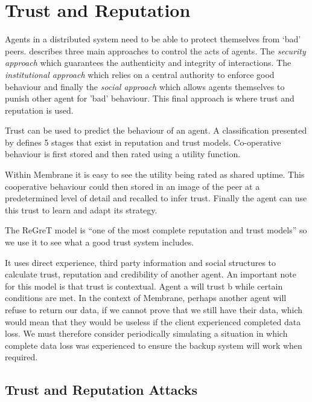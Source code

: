 \documentclass[11pt, a4paper, twocolumn, twoside]{report}
\begin{document}
\section{Trust and Reputation}

Agents in a distributed system need to be able to protect themselves from `bad' peers. \cite{pinyol2013computational} describes three main approaches to control the acts of agents. The \emph{security approach} which guarantees the authenticity and integrity of interactions. The \emph{institutional approach} which relies on a central authority to enforce good behaviour and finally the \emph{social approach} which allows agents themselves to punish other agent for 'bad' behaviour. This final approach is where trust and reputation is used.

Trust can be used to predict the behaviour of an agent. \citep{wooldridge2009introduction} A classification presented by \cite{balke2009using} defines 5 stages that exist in reputation and trust models. Co-operative behaviour is first stored and then rated using a utility function.

Within Membrane it is easy to see the utility being rated as shared uptime. This cooperative behaviour could then stored in an image of the peer at a predetermined level of detail and recalled to infer trust. Finally the agent can use this trust to learn and adapt its strategy.

The ReGreT model \citep{sabater2001regret} is ``one of the most complete reputation and trust models'' \citep{pinyol2013computational} so we use it to see what a good trust system includes.

It uses direct experience, third party information and social structures to calculate trust, reputation and credibility of another agent. An important note for this model is that trust is contextual. Agent a will trust b while certain conditions are met. In the context of Membrane, perhaps another agent will refuse to return our data, if we cannot prove that we still have their data, which would mean that they would be useless if the client experienced completed data loss. We must therefore consider periodically simulating a situation in which complete data loss was experienced to ensure the backup system will work when required.

\subsection{Trust and Reputation Attacks} \label{sec:tar}
\end{document}
